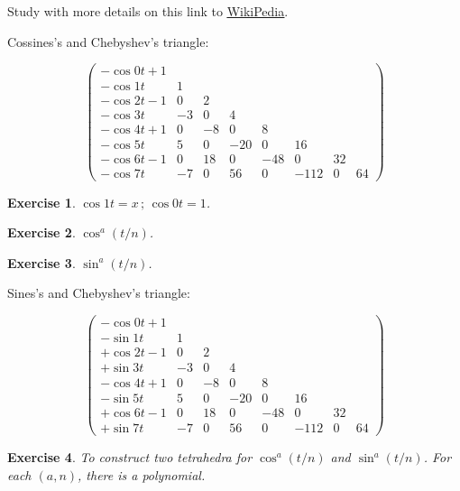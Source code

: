 \documentclass[11pt,a4paper]{article}
\newtheorem{exercise}{Exercise}
\begin{document}
Study with more details on this link to \href{https://en.wikipedia.org/wiki/Chebyshev_polynomials}{\color{blue}\underline{WikiPedia}}.

\vspace{3mm}

Cossines's and Chebyshev's triangle:

\begin{equation}
\left(\begin{matrix}
- \cos 0t + 1 \\
- \cos 1t & 1 \\
- \cos 2t - 1 & 0  & 2 \\
- \cos 3t     & -3 & 0  & 4 \\
- \cos 4t + 1 & 0  & -8 & 0   & 8 \\
- \cos 5t     & 5 & 0  & -20 & 0 & 16 \\
- \cos 6t -1 & 0 & 18 & 0 & -48 & 0 & 32 \\
- \cos 7t & -7 & 0 & 56 & 0 & -112 & 0 & 64
\end{matrix}
\right)
\end{equation}

\begin{exercise}
$\cos 1t = x\,;\,\cos 0t = 1$.
\end{exercise}

\begin{exercise}
$\cos^a (t/n)$.
\end{exercise}

\begin{exercise}
$\sin^a (t/n)$.
\end{exercise}

Sines's and Chebyshev's triangle:

\begin{equation}
\left(\begin{matrix}
- \cos 0t + 1 \\
- \sin 1t & 1 \\
+ \cos 2t - 1 & 0  & 2 \\
+ \sin 3t     & -3 & 0  & 4 \\
- \cos 4t + 1 & 0  & -8 & 0   & 8 \\
- \sin 5t     & 5 & 0  & -20 & 0 & 16 \\
+ \cos 6t -1 & 0 & 18 & 0 & -48 & 0 & 32 \\
+ \sin 7t & -7 & 0 & 56 & 0 & -112 & 0 & 64
\end{matrix}
\right)
\end{equation}

\begin{exercise}
To construct two tetrahedra for $\cos^a (t/n)$ and $\sin^a (t/n)$. For each $(a, n)$, there is a polynomial.
\end{exercise}
\end{document}

